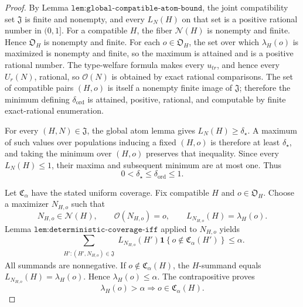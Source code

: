 \documentclass{article}
\begin{document}
\begin{proof}
By Lemma \(\texttt{lem:global-compatible-atom-bound}\), the joint compatibility set \(\mathfrak J\) is finite and nonempty, and every \(L_N(H)\) on that set is a positive rational number in \((0,1]\). For a compatible \(H\), the fiber \(\mathcal N(H)\) is nonempty and finite. Hence \(\mathfrak O_H\) is nonempty and finite. For each \(o\in\mathfrak O_H\), the set over which \(\lambda_H(o)\) is maximized is nonempty and finite, so the maximum is attained and is a positive rational number. The type-welfare formula makes every \(u_{tr}\), and hence every \(U_r(N)\), rational, so \(\mathcal O(N)\) is obtained by exact rational comparisons. The set of compatible pairs \((H,o)\) is itself a nonempty finite image of \(\mathfrak J\); therefore the minimum defining \(\delta_{\mathrm{ord}}\) is attained, positive, rational, and computable by finite exact-rational enumeration.

For every \((H,N)\in\mathfrak J\), the global atom lemma gives \(L_N(H)\ge\delta_\star\). A maximum of such values over populations inducing a fixed \((H,o)\) is therefore at least \(\delta_\star\), and taking the minimum over \((H,o)\) preserves that inequality. Since every \(L_N(H)\le1\), their maxima and subsequent minimum are at most one. Thus
\[
 0<\delta_\star\le\delta_{\mathrm{ord}}\le1.
\]

Let \(\mathfrak C_\alpha\) have the stated uniform coverage. Fix compatible \(H\) and \(o\in\mathfrak O_H\). Choose a maximizer \(N_{H,o}\) such that
\[
 N_{H,o}\in\mathcal N(H),\qquad
 \mathcal O(N_{H,o})=o,\qquad
 L_{N_{H,o}}(H)=\lambda_H(o).
\]
Lemma \(\texttt{lem:deterministic-coverage-iff}\) applied to \(N_{H,o}\) yields
\[
 \sum_{\substack{H':(H',N_{H,o})\in\mathfrak J}}
 L_{N_{H,o}}(H')
 \mathbf 1\!\left\{o\notin\mathfrak C_\alpha(H')\right\}
 \le\alpha.
\]
All summands are nonnegative. If \(o\notin\mathfrak C_\alpha(H)\), the \(H\)-summand equals \(L_{N_{H,o}}(H)=\lambda_H(o)\). Hence \(\lambda_H(o)\le\alpha\). The contrapositive proves
\[
 \lambda_H(o)>\alpha\Longrightarrow
 o\in\mathfrak C_\alpha(H).
\]


\end{proof}
\end{document}
